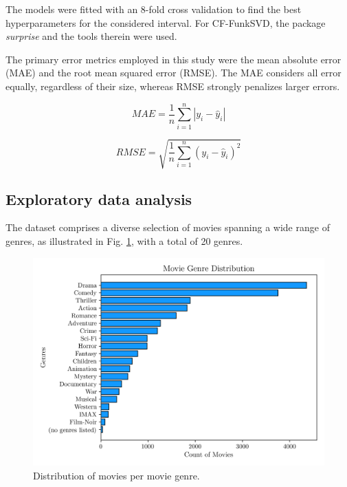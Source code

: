 \documentclass[conference]{IEEEtran}
\begin{document}
The models were fitted with an 8-fold cross validation to find the best hyperparameters for the considered interval. For CF-FunkSVD, the package \textit{surprise} and the tools therein \cite{surprise} were used. 

The primary error metrics employed in this study were the mean absolute error (MAE) and the root mean squared error (RMSE). The MAE considers all error equally, regardless of their size, whereas RMSE strongly penalizes larger errors.

\begin{equation}
MAE = \frac{1}{n}\sum^n_{i=1}|y_i-\hat{y}_i|
\end{equation}

\begin{equation}
RMSE = \sqrt{\frac{1}{n}\sum^{n}_{i=1}(y_i - \hat{y}_i)^2}
\end{equation}

\subsection{Exploratory data analysis}

The dataset comprises a diverse selection of movies spanning a wide range of genres, as illustrated in Fig. \ref{fig:genre_distribution}, with a total of 20 genres.

\begin{figure}[H]
    \centering
    \includegraphics[width=1\linewidth]{assets/genre_distribution.png}
    \caption{Distribution of movies per movie genre.}
    \label{fig:genre_distribution}
\end{figure}
\end{document}
